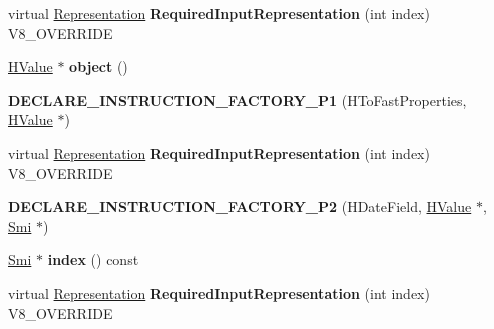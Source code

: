 \begin{DoxyCompactItemize}
\item 
\hypertarget{classv8_1_1internal_1_1_v8___f_i_n_a_l_a6c6d1f37f40b113d8f4062f1ffff7215}{}virtual \hyperlink{classv8_1_1internal_1_1_representation}{Representation} {\bfseries Required\+Input\+Representation} (int index) V8\+\_\+\+O\+V\+E\+R\+R\+I\+D\+E\label{classv8_1_1internal_1_1_v8___f_i_n_a_l_a6c6d1f37f40b113d8f4062f1ffff7215}

\item 
\hypertarget{classv8_1_1internal_1_1_v8___f_i_n_a_l_aae921c2c71c9b76679c7cc9ec058deb1}{}\hyperlink{classv8_1_1internal_1_1_h_value}{H\+Value} $\ast$ {\bfseries object} ()\label{classv8_1_1internal_1_1_v8___f_i_n_a_l_aae921c2c71c9b76679c7cc9ec058deb1}

\item 
\hypertarget{classv8_1_1internal_1_1_v8___f_i_n_a_l_a05ab907b63bbca6171f262c5c894764e}{}{\bfseries D\+E\+C\+L\+A\+R\+E\+\_\+\+I\+N\+S\+T\+R\+U\+C\+T\+I\+O\+N\+\_\+\+F\+A\+C\+T\+O\+R\+Y\+\_\+\+P1} (H\+To\+Fast\+Properties, \hyperlink{classv8_1_1internal_1_1_h_value}{H\+Value} $\ast$)\label{classv8_1_1internal_1_1_v8___f_i_n_a_l_a05ab907b63bbca6171f262c5c894764e}

\item 
\hypertarget{classv8_1_1internal_1_1_v8___f_i_n_a_l_a6c6d1f37f40b113d8f4062f1ffff7215}{}virtual \hyperlink{classv8_1_1internal_1_1_representation}{Representation} {\bfseries Required\+Input\+Representation} (int index) V8\+\_\+\+O\+V\+E\+R\+R\+I\+D\+E\label{classv8_1_1internal_1_1_v8___f_i_n_a_l_a6c6d1f37f40b113d8f4062f1ffff7215}

\item 
\hypertarget{classv8_1_1internal_1_1_v8___f_i_n_a_l_a2689f51b37ffe8478551687d38b63111}{}{\bfseries D\+E\+C\+L\+A\+R\+E\+\_\+\+I\+N\+S\+T\+R\+U\+C\+T\+I\+O\+N\+\_\+\+F\+A\+C\+T\+O\+R\+Y\+\_\+\+P2} (H\+Date\+Field, \hyperlink{classv8_1_1internal_1_1_h_value}{H\+Value} $\ast$, \hyperlink{classv8_1_1internal_1_1_smi}{Smi} $\ast$)\label{classv8_1_1internal_1_1_v8___f_i_n_a_l_a2689f51b37ffe8478551687d38b63111}

\item 
\hypertarget{classv8_1_1internal_1_1_v8___f_i_n_a_l_a0ed159684d1bd9921fb2787210742113}{}\hyperlink{classv8_1_1internal_1_1_smi}{Smi} $\ast$ {\bfseries index} () const \label{classv8_1_1internal_1_1_v8___f_i_n_a_l_a0ed159684d1bd9921fb2787210742113}

\item 
\hypertarget{classv8_1_1internal_1_1_v8___f_i_n_a_l_a6c6d1f37f40b113d8f4062f1ffff7215}{}virtual \hyperlink{classv8_1_1internal_1_1_representation}{Representation} {\bfseries Required\+Input\+Representation} (int index) V8\+\_\+\+O\+V\+E\+R\+R\+I\+D\+E\label{classv8_1_1internal_1_1_v8___f_i_n_a_l_a6c6d1f37f40b113d8f4062f1ffff7215}


\end{DoxyCompactItemize}

